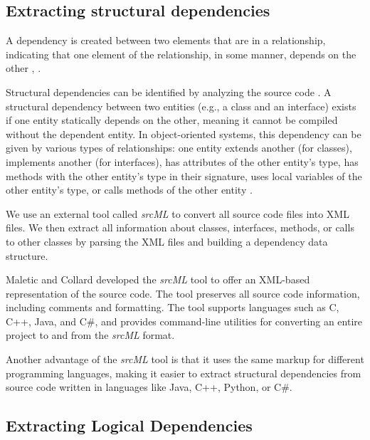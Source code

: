 \subsection{Extracting structural dependencies}
\label{subsec:extracting_structural_dependencies}

\hspace{4em}A dependency is created between two elements that are in a relationship, indicating that one element of the relationship, in some manner, depends on the other \cite{Booch:2004:OAD:975416}, \cite{Cataldo2009SoftwareDW}.

Structural dependencies can be identified by analyzing the source code \cite{structdep}. A structural dependency between two entities (e.g., a class and an interface) exists if one entity statically depends on the other, meaning it cannot be compiled without the dependent entity. In object-oriented systems, this dependency can be given by various types of relationships: one entity extends another (for classes), implements another (for interfaces), has attributes of the other entity's type, has methods with the other entity's type in their signature, uses local variables of the other entity's type, or calls methods of the other entity \cite{Sangal:2005:UDM:1094811.1094824, CalloArias2011, 1199197}.

We use an external tool called \textit{srcML} \cite{srcML} to convert all source code files into XML files. We then extract all information about classes, interfaces, methods, or calls to other classes by parsing the XML files and building a dependency data structure. 

Maletic and Collard \cite{srcMLCollard, Collard:2011:LTF:2067850.2068011, CollardsrcML2005} developed the \textit{srcML} tool to offer an XML-based representation of the source code. The tool preserves all source code information, including comments and formatting. The tool supports languages such as C, C++, Java, and C\#, and provides command-line utilities for converting an entire project to and from the \textit{srcML} format. 

Another advantage of the \textit{srcML} tool is that it uses the same markup for different programming languages, making it easier to extract structural dependencies from source code written in languages like Java, C++, Python, or C\#.



\subsection{Extracting Logical Dependencies}
\label{subsec:extracting_logical_dependencies}

